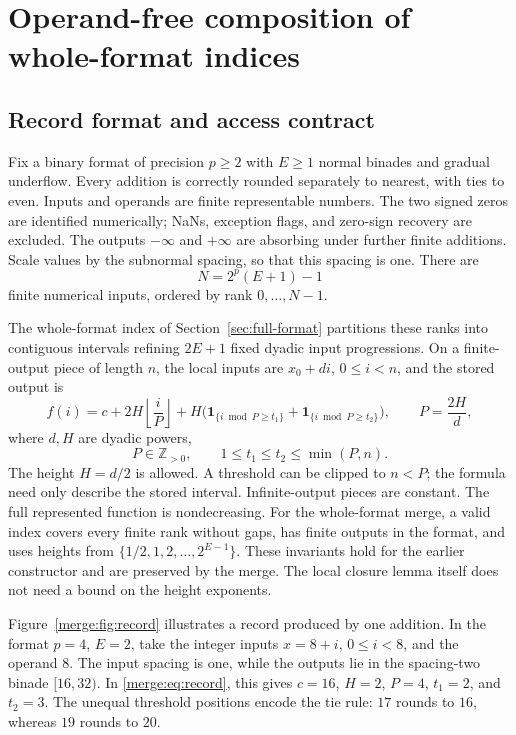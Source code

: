 \providecommand{\mergeind}[1]{\mathbf{1}_{\{#1\}}}
\section{Operand-free composition of whole-format indices}\label{merge:section}
\subsection{Record format and access contract}


Fix a binary format of precision $p\geq2$ with $E\geq1$ normal binades
and gradual underflow. Every addition is correctly rounded separately to
nearest, with ties to even. Inputs and operands are finite representable
numbers. The two signed zeros are identified numerically; NaNs, exception
flags, and zero-sign recovery are excluded. The outputs $-\infty$ and
$+\infty$ are absorbing under further finite additions. Scale values by
the subnormal spacing, so that this spacing is one. There are
\[
 N=2^p(E+1)-1
\]
finite numerical inputs, ordered by rank $0,\ldots,N-1$.

The whole-format index of Section~\ref{sec:full-format} partitions these ranks into
contiguous intervals refining $2E+1$ fixed dyadic input progressions.
On a finite-output piece of length $n$, the local inputs are $x_0+di$,
$0\leq i<n$, and the stored output is
\begin{equation}\label{merge:eq:record}
 f(i)=c+2H\left\lfloor\frac{i}{P}\right\rfloor
       +H\bigl(\mergeind{i\bmod P\geq t_1}+\mergeind{i\bmod P\geq t_2}\bigr),
 \qquad P=\frac{2H}{d},
\end{equation}
where $d,H$ are dyadic powers,
\[
 P\in\mathbb Z_{>0},\qquad 1\leq t_1\leq t_2\leq\min(P,n).
\]
The height $H=d/2$ is allowed. A threshold can be clipped to $n<P$;
the formula need only describe the stored interval. Infinite-output
pieces are constant. The full represented function is nondecreasing.
For the whole-format merge, a valid index covers every finite rank
without gaps, has finite outputs in the format, and uses heights from
$\{1/2,1,2,\ldots,2^{E-1}\}$. These invariants hold for the earlier
constructor and are preserved by the merge. The local closure lemma
itself does not need a bound on the height exponents.

Figure~\ref{merge:fig:record} illustrates a record produced by one
addition. In the format $p=4$, $E=2$, take the integer inputs $x=8+i$,
$0\leq i<8$, and the operand $8$. The input spacing is one, while the
outputs lie in the spacing-two binade $[16,32)$. In
\eqref{merge:eq:record}, this gives $c=16$, $H=2$, $P=4$, $t_1=2$,
and $t_2=3$. The unequal threshold positions encode the tie rule:
$17$ rounds to $16$, whereas $19$ rounds to $20$.

